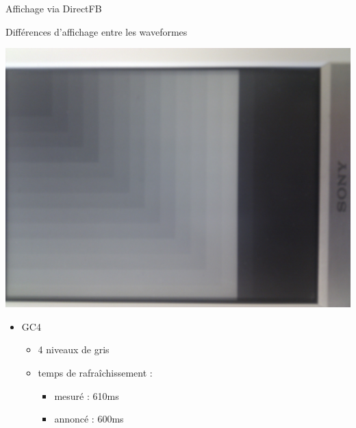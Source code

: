 \begin{frame}{ Affichage via DirectFB }
	\begin{block} { Différences d'affichage entre les waveformes }
		\parbox{0.3\linewidth}{
			\includegraphics[angle=-90,origin=c,scale=0.04]{gc4_8.jpg}
		}
		\parbox{0.6\linewidth}{
			\begin{itemize}
				\item GC4
				\begin{itemize}
					\item 4 niveaux de gris
					\item temps de rafraîchissement : 
					\begin{itemize}
						\item mesuré  : 610ms
						\item annoncé  : 600ms
					\end{itemize}		
				\end{itemize}
			\end{itemize}
		}
	\end{block}
\end{frame}
